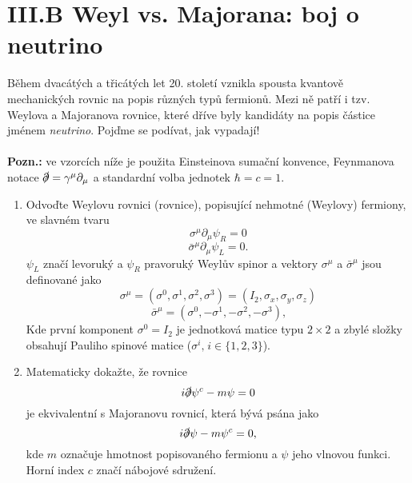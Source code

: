 \documentclass{../../../../style/mkimain}
\begin{document}
\section*{III.B Weyl vs. Majorana: boj o neutrino}
\noindent
Během dvacátých a třicátých let 20. století vznikla spousta kvantově mechanických rovnic na popis různých typů fermionů. Mezi ně patří i tzv.
Weylova a Majoranova rovnice, které dříve byly kandidáty na popis částice jménem \emph{neutrino}. Pojďme se podívat, jak vypadají!
\\
\\
\textbf{Pozn.:} ve vzorcích níže je použita Einsteinova sumační konvence, Feynmanova  notace $\slashed{\partial}=\gamma^\mu \partial_\mu$
a standardní volba jednotek $\hbar=c=1$.
\begin{enumerate}
    \item Odvoďte Weylovu rovnici (rovnice), popisující nehmotné (Weylovy) fermiony, ve slavném tvaru
    $$
    \sigma^\mu \partial_\mu \psi_R = 0
    $$
    $$
    \bar{\sigma}^\mu \partial_\mu \psi_L = 0 \text{.}
    $$
    $\psi_L$ značí levoruký a $\psi_R$ pravoruký Weylův spinor a vektory $\sigma^\mu$ a $\bar{\sigma}^\mu$ jsou definované jako
    $$\sigma^\mu = \left(\sigma^0, \sigma^1, \sigma^2, \sigma^3\right) = \left(I_2, \sigma_x, \sigma_y, \sigma_z\right)$$
    $$\bar{\sigma}^\mu = \left(\sigma^0, -\sigma^1, -\sigma^2, -\sigma^3\right)\text{,}$$
    Kde první komponent $\sigma^0=I_2$ je jednotková matice typu $2\times2$ a
    zbylé složky obsahují Pauliho spinové matice ($\sigma^i\text{,}\;i\in \{1,2,3\}$).
    
    \item Matematicky dokažte, že rovnice
    $$i\slashed{\partial}\psi^c-m\psi=0$$
    je ekvivalentní s Majoranovu rovnicí, která bývá psána jako
    $$i\slashed{\partial}\psi-m\psi^c=0\text{,}$$
    kde $m$ označuje hmotnost popisovaného fermionu a $\psi$ jeho vlnovou funkci. Horní index $c$ značí nábojové sdružení.
\end{enumerate}
\end{document}
